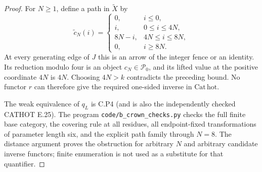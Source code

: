\begin{proof}
For $N\geq1$, define a path in $\widetilde X$ by
\[
 \widetilde c_N(i)=
 \begin{cases}
 0,&i\leq0,\\
 i,&0\leq i\leq4N,\\
 8N-i,&4N\leq i\leq8N,\\
 0,&i\geq8N.
 \end{cases}
\]
At every generating edge of $J$ this is an arrow of the integer fence or an identity. Its reduction modulo four is an object $c_N\in\mathcal P_0$, and its lifted value at the positive coordinate $4N$ is $4N$. Choosing $4N>k$ contradicts the preceding bound. No functor $r$ can therefore give the required one-sided inverse in $\mathrm{Cat}\,\mathrm{hot}$.

The weak equivalence of $q_L$ is C.P4 (and is also the independently checked CATHOT E.25). The program \texttt{code/b\_crown\_checks.py} checks the full finite base category, the covering rule at all residues, all endpoint-fixed transformations of parameter length six, and the explicit path family through $N=8$. The distance argument proves the obstruction for arbitrary $N$ and arbitrary candidate inverse functors; finite enumeration is not used as a substitute for that quantifier.
\end{proof}
